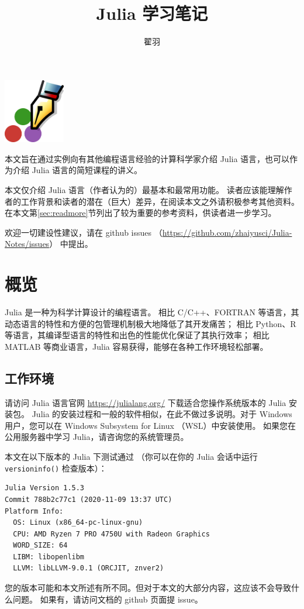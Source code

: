 \documentclass[10pt,a4paper]{article}
\begin{document}
\title{Julia 学习笔记}
\author{翟羽}
\maketitle

{\centering
\includegraphics[width=0.2\textwidth]{pen.png}

}

\begin{multicols}{2}
	\tableofcontents
\end{multicols}



本文旨在通过实例向有其他编程语言经验的计算科学家介绍 Julia 语言，也可以作为介绍 Julia 语言的简短课程的讲义。

本文仅介绍 Julia 语言（作者认为的）最基本和最常用功能。
读者应该能理解作者的工作背景和读者的潜在（巨大）差异，在阅读本文之外请积极参考其他资料。
在本文第\ref{sec:readmore}节列出了较为重要的参考资料，供读者进一步学习。

欢迎一切建设性建议，请在 github issues （\url{https://github.com/zhaiyusci/Julia-Notes/issues}）  中提出。


\section{概览}

Julia 是一种为科学计算设计的编程语言。
相比 C/C++、FORTRAN 等语言，其动态语言的特性和方便的包管理机制极大地降低了其开发痛苦；
相比 Python、R 等语言，其编译型语言的特性和出色的性能优化保证了其执行效率；
相比 MATLAB 等商业语言，Julia 容易获得，能够在各种工作环境轻松部署。

\subsection{工作环境}

请访问 Julia 语言官网 \url{https://julialang.org/} 下载适合您操作系统版本的 Julia 安装包。
Julia 的安装过程和一般的软件相似，在此不做过多说明。对于 Windows 用户，您可以在 Windows Subsystem for Linux （WSL）中安装使用。
如果您在公用服务器中学习 Julia，请咨询您的系统管理员。

本文在以下版本的 Julia 下测试通过
（你可以在你的 Julia 会话中运行\lstinline|versioninfo()| 检查版本）：
\begin{lstlisting}
Julia Version 1.5.3
Commit 788b2c77c1 (2020-11-09 13:37 UTC)
Platform Info:
  OS: Linux (x86_64-pc-linux-gnu)
  CPU: AMD Ryzen 7 PRO 4750U with Radeon Graphics
  WORD_SIZE: 64
  LIBM: libopenlibm
  LLVM: libLLVM-9.0.1 (ORCJIT, znver2)
\end{lstlisting}
您的版本可能和本文所述有所不同。但对于本文的大部分内容，这应该不会导致什么问题。
如果有，请访问文档的 github 页面提 issue。
\end{document}
